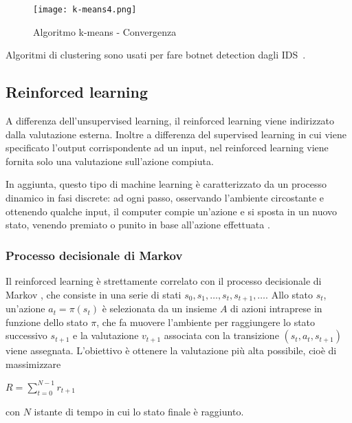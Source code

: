 \documentclass[../main.tex]{subfiles}
\begin{document}
\begin{figure}[H]
				\centering
				\texttt{[image: k-means4.png]}
				\caption{Algoritmo k-means - Convergenza}
\end{figure}

Algoritmi di clustering sono usati per fare botnet detection dagli IDS~\cite{netflowbotnetdetection}.

\subsection{Reinforced learning}
A differenza dell'unsupervised learning, il reinforced learning viene indirizzato dalla valutazione esterna. Inoltre a differenza del supervised learning in cui viene specificato l'output corrispondente ad un input, nel reinforced learning viene fornita solo una valutazione sull'azione compiuta.

In aggiunta, questo tipo di machine learning è caratterizzato da un processo dinamico in fasi discrete: ad ogni passo, osservando l'ambiente circostante e ottenendo qualche input, il computer compie un'azione e si sposta in un nuovo stato, venendo premiato o punito in base all'azione effettuata \cite{compIntelligence}.

\subsubsection{Processo decisionale di Markov}
Il reinforced learning è strettamente correlato con il processo decisionale di Markov \cite{compIntelligence}, che consiste in una serie di stati $s _ { 0 } , s _ { 1 } , \ldots , s _ { t } , s _ { t + 1 } , \ldots$. Allo stato ${ s } _ { t }$, un'azione $a _ { t } = \pi \left( s _ { t } \right)$ è selezionata da un insieme $A$ di azioni intraprese in funzione dello stato $\pi$, che fa muovere l'ambiente per raggiungere lo stato successivo $s _ { t  + 1}$ e la valutazione $v _ {t + 1}$ associata con la transizione $\left( s _ { t } , a _ { t } , s _ { t + 1 } \right)$ viene assegnata. L'obiettivo è ottenere la valutazione più alta possibile, cioè di massimizzare 

\begin{center}
				\begin{math}
								R = \sum _ { t = 0 } ^ { N - 1 } r _ { t + 1 }
				\end{math}
\end{center}

con $N$ istante di tempo in cui lo stato finale è raggiunto.
\end{document}
